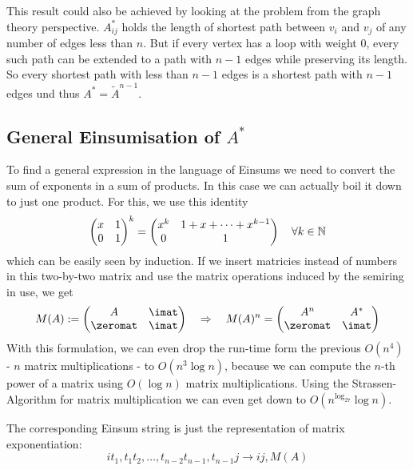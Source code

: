 This result could also be achieved by looking at the problem from the graph theory perspective. $A^*_{ij}$ holds the length of shortest path between $v_i$ and $v_j$ of any number of edges less than $n$. But if every vertex has a loop with weight 0, every such path can be extended to a path with $n-1$ edges while preserving its length. So every shortest path with less than $n-1$ edges is a shortest path with $n-1$ edges und thus $A^* = \tilde A^{n-1}$.

\subsection{General Einsumisation of $A^*$}
To find a general expression in the language of Einsums we need to convert the sum of exponents in a sum of products. In this case we can actually boil it down to just one product. For this, we use this identity
$$\left(\begin{matrix}
    x & 1\\
    0 & 1
\end{matrix}\right)^k = \left(\begin{matrix}
    x^k & 1 + x + \dots + x^{k-1} \\
    0 & 1
\end{matrix}\right) \quad \forall k \in \mathbb{N}$$
which can be easily seen by induction. If we insert matricies instead of numbers in this two-by-two matrix and use the matrix operations induced by the semiring in use, we get
$$M(A) := \left(\begin{matrix}
    A & \imat\\
    \zeromat & \imat
\end{matrix}\right) \quad\Rightarrow\quad M(A)^n = \left(\begin{matrix}
    A^n & A^* \\
    \zeromat & \imat
\end{matrix}\right)$$
With this formulation, we can even drop the run-time form the previous $O(n^4)$ - $n$ matrix multiplications - to $O(n^3 \log n)$, because we can compute the $n$-th power of a matrix using $O(\log n)$ matrix multiplications. Using the Strassen-Algorithm for matrix multiplication we can even get down to $O(n^{\log_27}\log n)$.

The corresponding Einsum string is just the representation of matrix exponentiation:
$$it_1,t_1t_2,\dots, t_{n-2}t_{n-1},t_{n-1}j \rightarrow ij, M(A)$$

